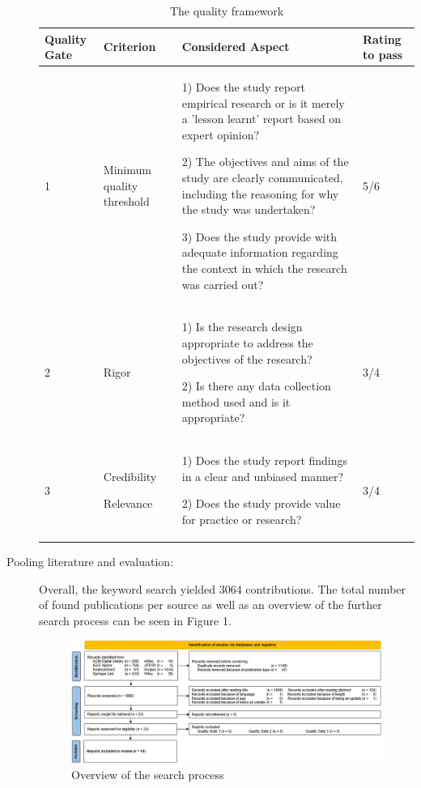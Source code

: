 \documentclass[a4paper,11pt,article,oneside]{memoir}
\begin{document}
\begin{description}
    \begin{table}[h]
        \renewcommand{\arraystretch}{1}
        \caption[]{The quality framework}
        \begin{tabular}{|p{1cm}|p{2cm}|p{10cm}|p{1.5cm}|}
            \hline
            Quality Gate & Criterion & Considered Aspect & Rating to pass \\ 
    
            \hline
    
            1 & Minimum quality threshold & 
            
            1) Does the study report empirical research or is it merely a 'lesson learnt' report based on expert opinion?
    
            2) The objectives and aims of the study are clearly communicated, including the reasoning for why the study was undertaken?
    
            3) Does the study provide with adequate information regarding the context in which the research was carried out?
            & 5/6 \\ 
            \hline
            2 & Rigor & 
            
            1) Is the research design appropriate to address the objectives of the research?
    
            2) Is there any data collection method used and is it appropriate?
            & 3/4 \\ 
            \hline  
            3 &
             Credibility 
    
             Relevance 
            & 
            1) Does the study report findings in a clear and unbiased manner?
    
            2) Does the study provide value for practice or research?
            & 
            3/4 \\ 
            \hline   
        \end{tabular}
        \label{qualityFramework}
    \end{table}
    

    \item[Pooling literature and evaluation:] Overall, the keyword search yielded 3064 contributions. The total number of found publications per source as well as an overview of the further search process can be seen in Figure 1.
    \begin{figure}[h]
        \centering 
        \includegraphics[width=14cm]{Media/PRISMA-Flowchart-Compact.JPG}
        \caption{Overview of the search process}
        \label{fig:PRISMA}
    \end{figure}
    

\end{description}
\end{document}
